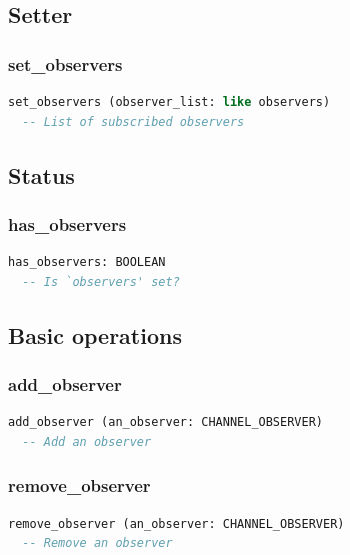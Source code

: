 \subsection{Setter}
\label{sec:feed-observable-channel-setter}

\subsubsection{set\_observers}

\begin{lstlisting}[language=Eiffel]
set_observers (observer_list: like observers)
  -- List of subscribed observers
\end{lstlisting}


\subsection{Status}
\label{sec:feed-observable-channel-status}

\subsubsection{has\_observers}

\begin{lstlisting}[language=Eiffel]
has_observers: BOOLEAN
  -- Is `observers' set?
\end{lstlisting}


\subsection{Basic operations}
\label{sec:feed-observable-channel-basic-operations}

\subsubsection{add\_observer}

\begin{lstlisting}[language=Eiffel]
add_observer (an_observer: CHANNEL_OBSERVER)
  -- Add an observer
\end{lstlisting}

\subsubsection{remove\_observer}

\begin{lstlisting}[language=Eiffel]
remove_observer (an_observer: CHANNEL_OBSERVER)
  -- Remove an observer
\end{lstlisting}


